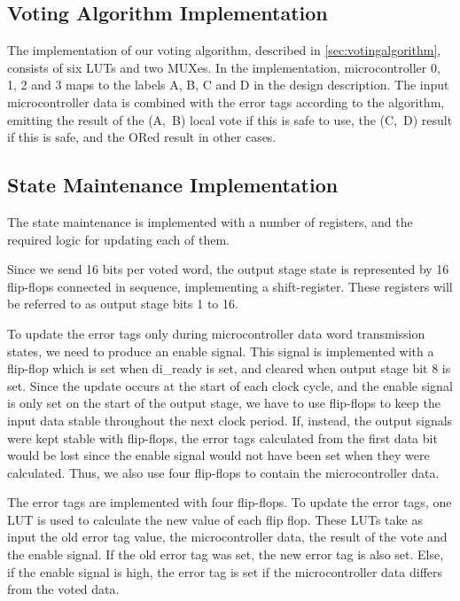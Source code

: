 \subsection{Voting Algorithm Implementation}
The implementation of our voting algorithm, described in
\autoref{sec:votingalgorithm}, consists of six LUTs and two MUXes. In
the implementation, microcontroller 0, 1, 2 and 3 maps to the labels
A, B, C and D in the design description. The input microcontroller
data is combined with the error tags according to the algorithm,
emitting the result of the (A,~B) local vote if this is safe to use,
the (C,~D) result if this is safe, and the ORed result in other cases.


\subsection{State Maintenance Implementation}
\label{sec:statemaintenance}
The state maintenance is implemented with a number of registers, and
the required logic for updating each of them.

Since we send 16 bits per voted word, the output stage state is
represented by 16 flip-flops connected in sequence, implementing a
shift-register. These registers will be referred to as output stage
bits 1 to 16. 

To update the error tags only during microcontroller data word
transmission states, we need to produce an enable signal. This signal
is implemented with a flip-flop which is set when di\_ready is set,
and cleared when output stage bit 8 is set. Since the update occurs at
the start of each clock cycle, and the enable signal is only set on
the start of the output stage, we have to use flip-flops to keep the
input data stable throughout the next clock period. If, instead, the
output signals were kept stable with flip-flops, the error tags
calculated from the first data bit would be lost since the enable
signal would not have been set when they were calculated. Thus, we
also use four flip-flops to contain the microcontroller data.

The error tags are implemented with four flip-flops. To update the
error tags, one LUT is used to calculate the new value of each flip
flop. These LUTs take as input the old error tag value, the
microcontroller data, the result of the vote and the enable
signal.  If the old error tag
was set, the new error tag is also set. Else, if the enable signal is
high, the error tag is set if the microcontroller data differs from
the voted data.


